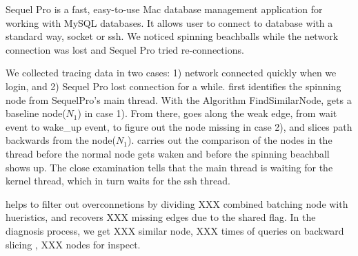 Sequel Pro is a fast, easy-to-use Mac database management application for
working with MySQL databases. It allows user to connect to database with a
standard way, socket or ssh. We noticed spinning beachballs while the network
connection was lost and Sequel Pro tried re-connections.

We collected tracing data in two cases: 1) network connected quickly when we
login, and 2) Sequel Pro lost connection for a while. \xxx first identifies the
spinning node from SequelPro's main thread. With the Algorithm FindSimilarNode,
\xxx gets a baseline node($N_1$) in case 1). From there, \xxx goes along the
weak edge, from wait event to wake\_up event, to figure out the node missing
in case 2), and slices path backwards from the node($N_1$). \xxx carries out
the comparison of the nodes in the thread before the normal node gets waken and
before the spinning beachball shows up. The close examination tells that the
main thread is waiting for the kernel thread, which in turn waits for the ssh
thread.

\xxx helps to filter out overconnetions by dividing XXX combined batching node
with hueristics, and recovers XXX missing edges due to the shared flag. In the
diagnosis process, we get XXX similar node, XXX times of queries on backward
slicing , XXX nodes for inspect.

